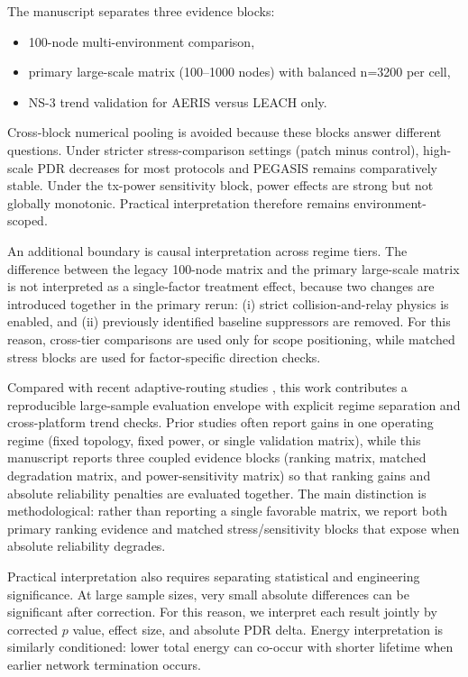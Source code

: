 ﻿\documentclass[sensors,article,submit,moreauthors,pdftex]{Definitions/mdpi}
\begin{document}
The manuscript separates three evidence blocks:
\begin{itemize}
\item 100-node multi-environment comparison,
\item primary large-scale matrix (100--1000 nodes) with balanced n=3200 per cell,
\item NS-3 trend validation for AERIS versus LEACH only.
\end{itemize}
Cross-block numerical pooling is avoided because these blocks answer different questions. Under stricter stress-comparison settings (patch minus control), high-scale PDR decreases for most protocols and PEGASIS remains comparatively stable. Under the tx-power sensitivity block, power effects are strong but not globally monotonic. Practical interpretation therefore remains environment-scoped.

An additional boundary is causal interpretation across regime tiers. The difference between the legacy 100-node matrix and the primary large-scale matrix is not interpreted as a single-factor treatment effect, because two changes are introduced together in the primary rerun: (i) strict collision-and-relay physics is enabled, and (ii) previously identified baseline suppressors are removed. For this reason, cross-tier comparisons are used only for scope positioning, while matched stress blocks are used for factor-specific direction checks.

Compared with recent adaptive-routing studies \cite{Ren2024,Okine2024,Naeem2024DRL,Scientific2025DRLGNN,Kaddi2024GWOCSMA,Wang2024Geographic,Tariq2024A,Jain2025Optimized,Ti2026HEOCP,Manogaran2025DDQN}, this work contributes a reproducible large-sample evaluation envelope with explicit regime separation and cross-platform trend checks. Prior studies often report gains in one operating regime (fixed topology, fixed power, or single validation matrix), while this manuscript reports three coupled evidence blocks (ranking matrix, matched degradation matrix, and power-sensitivity matrix) so that ranking gains and absolute reliability penalties are evaluated together. The main distinction is methodological: rather than reporting a single favorable matrix, we report both primary ranking evidence and matched stress/sensitivity blocks that expose when absolute reliability degrades.

Practical interpretation also requires separating statistical and engineering significance. At large sample sizes, very small absolute differences can be significant after correction. For this reason, we interpret each result jointly by corrected $p$ value, effect size, and absolute PDR delta. Energy interpretation is similarly conditioned: lower total energy can co-occur with shorter lifetime when earlier network termination occurs.
\end{document}
